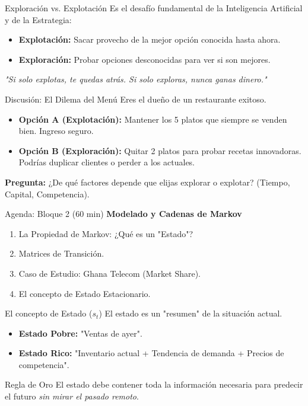 \documentclass{beamer}
\begin{document}
\begin{frame}{Exploración vs. Explotación}
Es el desafío fundamental de la Inteligencia Artificial y de la Estrategia:
\begin{itemize}
    \item \textbf{Explotación:} Sacar provecho de la mejor opción conocida hasta ahora.
    \item \textbf{Exploración:} Probar opciones desconocidas para ver si son mejores.
\end{itemize}
\vspace{0.3cm}
\textit{"Si solo explotas, te quedas atrás. Si solo exploras, nunca ganas dinero."}
\end{frame}

\begin{frame}{Discusión: El Dilema del Menú}
Eres el dueño de un restaurante exitoso.
\begin{itemize}
    \item \textbf{Opción A (Explotación):} Mantener los 5 platos que siempre se venden bien. Ingreso seguro.
    \item \textbf{Opción B (Exploración):} Quitar 2 platos para probar recetas innovadoras. Podrías duplicar clientes o perder a los actuales.
\end{itemize}
\vspace{0.3cm}
\textbf{Pregunta:} ¿De qué factores depende que elijas explorar o explotar? (Tiempo, Capital, Competencia).
\end{frame}

\begin{frame}{Agenda: Bloque 2 (60 min)}
\textbf{Modelado y Cadenas de Markov}
\begin{enumerate}
    \item La Propiedad de Markov: ¿Qué es un "Estado"?
    \item Matrices de Transición.
    \item Caso de Estudio: Ghana Telecom (Market Share).
    \item El concepto de Estado Estacionario.
\end{enumerate}
\end{frame}

\begin{frame}{El concepto de Estado ($s_t$)}
El estado es un "resumen" de la situación actual.
\begin{itemize}
    \item \textbf{Estado Pobre:} "Ventas de ayer".
    \item \textbf{Estado Rico:} "Inventario actual + Tendencia de demanda + Precios de competencia".
\end{itemize}
\vspace{0.3cm}
\begin{alertblock}{Regla de Oro}
El estado debe contener toda la información necesaria para predecir el futuro \textit{sin mirar el pasado remoto}.
\end{alertblock}
\end{frame}
\end{document}
